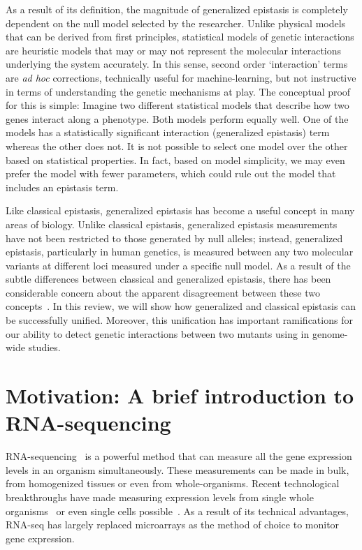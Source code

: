 As a result of its definition, the magnitude of generalized epistasis is
completely dependent on the null model selected by the researcher. Unlike
physical models that can be derived from first principles, statistical models of
genetic interactions are heuristic models that may or may not represent the
molecular interactions underlying the system accurately. In this sense, second
order `interaction' terms are \emph{ad hoc} corrections, technically
useful for machine-learning, but not instructive in terms of understanding the
genetic mechanisms at play. The conceptual proof for this is simple: Imagine
two different statistical models that describe how two genes interact along a
phenotype. Both models perform equally well. One of the models has a
statistically significant interaction (generalized epistasis) term whereas the
other does not. It is not possible to select one model over the other based on
statistical properties. In fact, based on model simplicity, we may even prefer
the model with fewer parameters, which could rule out the model that includes an
epistasis term.

Like classical epistasis, generalized epistasis has become a useful concept in
many areas of biology. Unlike classical epistasis, generalized epistasis
measurements have not been restricted to those generated by null alleles;
instead, generalized epistasis, particularly in human genetics, is measured
between any two molecular variants at different loci measured under a specific
null model. As a result of the subtle differences between classical and
generalized epistasis, there has been considerable concern about the apparent
disagreement between these two
concepts~\citep{Phillips2008,Cordell2002,Lehner2011}. In this review, we will
show how generalized and classical epistasis can be successfully unified.
Moreover, this unification has important ramifications for our ability to detect
genetic interactions between two mutants using in genome-wide studies.

\section*{Motivation: A brief introduction to RNA-sequencing}
RNA-sequencing~\citep{Mortazavi2008} is a powerful method that can measure all
the gene expression levels in an organism simultaneously. These measurements can
be made in bulk, from homogenized tissues or even from whole-organisms.
Recent technological breakthroughs have made measuring expression levels from
single whole organisms~\citep{Serra2018,Chan2018,Lott2011} or even single cells
possible~\citep{Tang2009}. As a result of its technical advantages, RNA-seq has
largely replaced microarrays as the method of choice to monitor gene expression.

